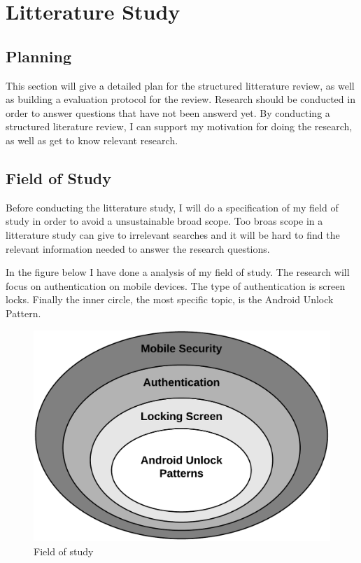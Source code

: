 
\chapter{Litterature Study}

  \section{Planning}

    This section will give a detailed plan for the structured litterature review, as well as building a 
    evaluation protocol for the review. 
    Research should be conducted in order to answer questions that have not been answerd yet. 
    By conducting a structured literature review, I can support my motivation for doing the research, 
    as well as get to know relevant research. 

    \section{Field of Study}

      Before conducting the litterature study, I will do a specification of my field of study in order to
      avoid a unsustainable broad scope. Too broas scope in a litterature study can give to irrelevant searches 
      and it will be hard to find the relevant information needed to answer the research questions. 

      In the figure below I have done a analysis of my field of study. The research will focus on authentication on mobile devices. 
      The type of authentication is screen locks. Finally the inner circle, the most specific topic, is the Android Unlock Pattern. 

      \begin{figure}[H]
        \centering
        \includegraphics[scale=0.25]{pics/Fieldofstudy.png}
        \caption{Field of study}
      \end{figure}

